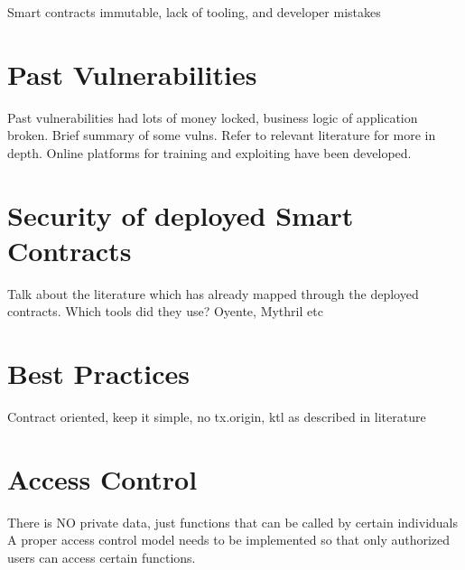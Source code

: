 Smart contracts immutable, lack of tooling, and developer mistakes

\section{Past Vulnerabilities}
Past vulnerabilities had lots of money locked, business logic of application broken. Brief summary of some vulns. Refer to relevant literature for more in depth.
Online platforms for training and exploiting have been developed.

\section{Security of deployed Smart Contracts}
Talk about the literature which has already mapped through the deployed contracts. 
Which tools did they use? Oyente, Mythril etc

\section{Best Practices}
Contract oriented, keep it simple, no tx.origin, ktl as described in literature


\section{Access Control}
There is NO private data, just functions that can be called by certain individuals
A proper access control model needs to be implemented so that only authorized users can access certain functions. 
